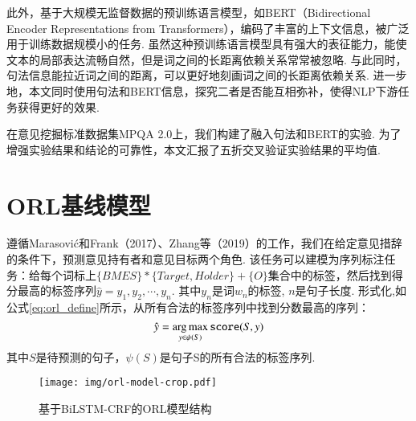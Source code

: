 此外，基于大规模无监督数据的预训练语言模型，如BERT（Bidirectional Encoder Representations from Transformers），编码了丰富的上下文信息，被广泛用于训练数据规模小的任务.
虽然这种预训练语言模型具有强大的表征能力，能使文本的局部表达流畅自然，但是词之间的长距离依赖关系常常被忽略.
与此同时，句法信息能拉近词之间的距离，可以更好地刻画词之间的长距离依赖关系.
进一步地，本文同时使用句法和BERT信息，探究二者是否能互相弥补，使得NLP下游任务获得更好的效果.

在意见挖掘标准数据集MPQA 2.0上，我们构建了融入句法和BERT的实验. 为了增强实验结果和结论的可靠性，本文汇报了五折交叉验证实验结果的平均值.
%


\section{ORL基线模型}
遵循Marasovi{\'c}和Frank（2017）、Zhang等（2019）的工作，我们在给定意见措辞的条件下，预测意见持有者和意见目标两个角色. 该任务可以建模为序列标注任务：给每个词标上$\{BMES\}*\{Target, Holder\} + \{O\}$集合中的标签，然后找到得分最高的标签序列$\hat{y} = y_1,y_2,\cdots, y_n$.
其中$y_n$是词$w_n$的标签, $n$是句子长度. 形式化,如公式\ref{eq:orl_define}所示，从所有合法的标签序列中找到分数最高的序列：
\begin{equation}
    \setlength{\abovedisplayskip}{9pt}
    \setlength{\belowdisplayskip}{9pt}
    \label{eq:orl_define}
    \hat{y} = \mathop{\arg\max}_{y \in \psi(S)} \texttt{score}(S, y)
\end{equation}
其中$S$是待预测的句子，$\psi(S)$是句子S的所有合法的标签序列.

\begin{figure}[hb]
    \centering
    \texttt{[image: img/orl-model-crop.pdf]}
    \caption{基于BiLSTM-CRF的ORL模型结构}
    \label{fig:orl_model}
\end{figure}

